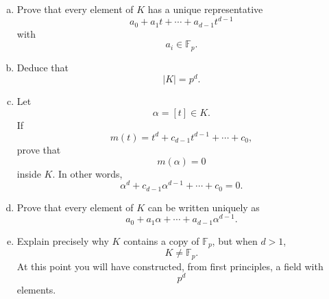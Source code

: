 \documentclass[12pt]{article}
\begin{document}
\begin{enumerate}
        \begin{enumerate}[(a)]
          \item
                Prove that every element of \(K\) has a unique representative
                \[
                a_0+a_1t+\cdots+a_{d-1}t^{d-1}
                \]with
                \[
                a_i\in\mathbb F_p.
                \]
          \item
                Deduce that
                \[
                \boxed{|K|=p^d.}
                \]
          \item
                Let
                \[
                \alpha=[t]\in K.
                \]If
                \[
                m(t)
                =
                t^d+c_{d-1}t^{d-1}+\cdots+c_0,
                \]prove that
                \[
                m(\alpha)=0
                \]inside \(K\).
                In other words,
                \[
                \alpha^d
                +
                c_{d-1}\alpha^{d-1}
                +\cdots+c_0
                =
                0.
                \]
          \item
                Prove that every element of \(K\) can be written uniquely as
                \[
                a_0+a_1\alpha+\cdots+a_{d-1}\alpha^{d-1}.
                \]
          \item
                Explain precisely why \(K\) contains a copy of \(\mathbb F_p\), but when \(d>1\),
                \[
                K\neq\mathbb F_p.
                \]At this point you will have constructed, from first principles, a field with
                \[
                p^d
                \]elements.
        \end{enumerate}

\end{enumerate}
\end{document}
